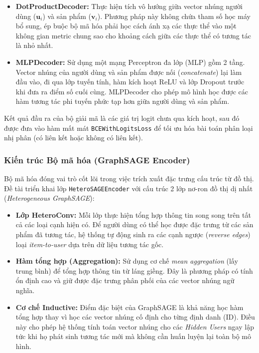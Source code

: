 \begin{itemize}
    \item \textbf{DotProductDecoder:} Thực hiện tích vô hướng giữa vector nhúng người dùng ($\mathbf{u}_i$) và sản phẩm ($\mathbf{v}_i$). Phương pháp này không chứa tham số học máy bổ sung, ép buộc bộ mã hóa phải học cách ánh xạ các thực thể vào một không gian metric chung sao cho khoảng cách giữa các thực thể có tương tác là nhỏ nhất.
    \item \textbf{MLPDecoder:} Sử dụng một mạng Perceptron đa lớp (MLP) gồm 2 tầng. Vector nhúng của người dùng và sản phẩm được nối (\textit{concatenate}) lại làm đầu vào, đi qua lớp tuyến tính, hàm kích hoạt ReLU và lớp Dropout trước khi đưa ra điểm số cuối cùng. MLPDecoder cho phép mô hình học được các hàm tương tác phi tuyến phức tạp hơn giữa người dùng và sản phẩm.
\end{itemize}

Kết quả đầu ra của bộ giải mã là các giá trị logit chưa qua kích hoạt, sau đó được đưa vào hàm mất mát \texttt{BCEWithLogitsLoss} để tối ưu hóa bài toán phân loại nhị phân (có liên kết hoặc không có liên kết).

\subsubsection{Kiến trúc Bộ mã hóa (GraphSAGE Encoder)}

Bộ mã hóa đóng vai trò cốt lõi trong việc trích xuất đặc trưng cấu trúc từ đồ thị. Đề tài triển khai lớp \texttt{HeteroSAGEEncoder} với cấu trúc 2 lớp nơ-ron đồ thị dị nhất (\textit{Heterogeneous GraphSAGE}):

\begin{itemize}
    \item \textbf{Lớp HeteroConv:} Mỗi lớp thực hiện tổng hợp thông tin song song trên tất cả các loại cạnh hiện có. Để người dùng có thể học được đặc trưng từ các sản phẩm đã tương tác, hệ thống tự động sinh ra các cạnh ngược (\textit{reverse edges}) loại \textit{item-to-user} dựa trên dữ liệu tương tác gốc.
    \item \textbf{Hàm tổng hợp (Aggregation):} Sử dụng cơ chế \textit{mean aggregation} (lấy trung bình) để tổng hợp thông tin từ láng giềng. Đây là phương pháp có tính ổn định cao và giữ được đặc trưng phân phối của các vector nhúng ngữ nghĩa.
    \item \textbf{Cơ chế Inductive:} Điểm đặc biệt của GraphSAGE là khả năng học hàm tổng hợp thay vì học các vector nhúng cố định cho từng định danh (ID). Điều này cho phép hệ thống tính toán vector nhúng cho các \textit{Hidden Users} ngay lập tức khi họ phát sinh tương tác mới mà không cần huấn luyện lại toàn bộ mô hình.
\end{itemize}

